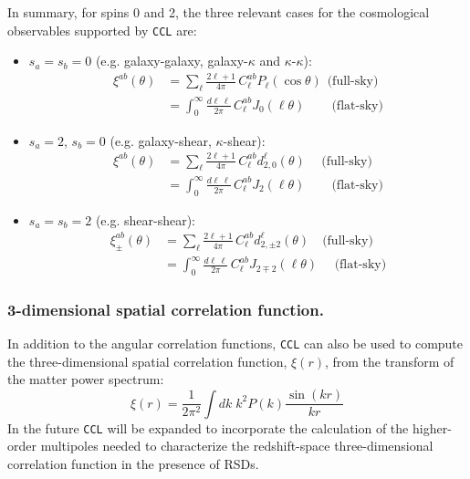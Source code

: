 \documentclass[\docopts]{\docclass}
\newcommand{\ccl}{{\tt CCL}\xspace}
\begin{document}
In summary, for spins 0 and 2, the three relevant cases for the cosmological observables supported by \ccl are:
\begin{itemize}
  \item $s_a=s_b=0$ (e.g. galaxy-galaxy, galaxy-$\kappa$ and $\kappa$-$\kappa$):
    \begin{align}\label{eq:xi00full}
      \xi^{ab}(\theta)&=\sum_\ell\frac{2\ell+1}{4\pi}\,C^{ab}_\ell P_\ell(\cos\theta)\hspace{5pt}\text{(full-sky)}\\\label{eq:xi00flat}
                      &=\int_0^\infty\frac{d\ell\,\ell}{2\pi}\,C^{ab}_\ell J_0(\ell\theta)\hspace{25pt}\text{(flat-sky)}
    \end{align}
  \item $s_a=2$, $s_b=0$ (e.g. galaxy-shear, $\kappa$-shear):
    \begin{align}\label{eq:xi02full}
      \xi^{ab}(\theta)&=\sum_\ell\frac{2\ell+1}{4\pi}\,C^{ab}_\ell d^\ell_{2,0}(\theta)\hspace{15pt}\text{(full-sky)}\\\label{eq:xi02flat}
                      &=\int_0^\infty\frac{d\ell\,\ell}{2\pi}\,C^{ab}_\ell J_2(\ell\theta)\hspace{25pt}\text{(flat-sky)}
    \end{align}
  \item $s_a=s_b=2$ (e.g. shear-shear):
    \begin{align}\label{eq:xi22full}
      \xi^{ab}_\pm(\theta)&=\sum_\ell\frac{2\ell+1}{4\pi}\,C^{ab}_\ell d^\ell_{2,\pm2}(\theta)\hspace{12pt}\text{(full-sky)}\\\label{eq:xi22flat}
                      &=\int_0^\infty\frac{d\ell\,\ell}{2\pi}\,C^{ab}_\ell J_{2\mp2}(\ell\theta)\hspace{16pt}\text{(flat-sky)}
    \end{align}
\end{itemize}

\subsubsection{3-dimensional spatial correlation function.}
In addition to the angular correlation functions, \ccl can also be used to compute the three-dimensional spatial correlation function, $\xi(r)$, from the transform of the matter power spectrum:
\begin{equation}
\xi(r) = \frac{1}{2 \pi^2} \int dk \; k^2 P(k) \frac{\sin(kr)}{kr}
\label{eq:xi3d}
\end{equation}
In the future \ccl will be expanded to incorporate the calculation of the higher-order multipoles needed to characterize the redshift-space three-dimensional correlation function in the presence of RSDs.
\end{document}

